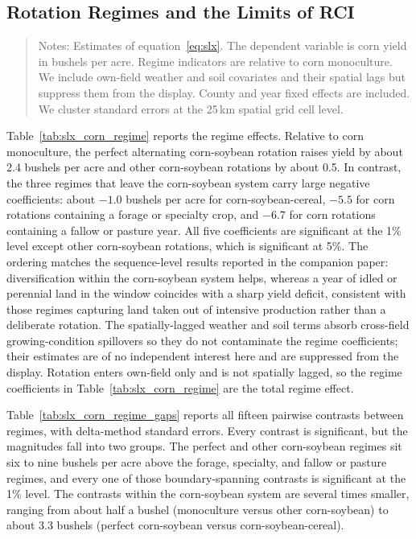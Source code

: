 \documentclass[12pt,letterpaper]{article}
\theoremstyle{remark}
\theoremstyle{remark}
\let\oldtable\table
\let\endoldtable\endtable
\renewenvironment{table}[1][H]{\oldtable[H]}{\endoldtable}
\theoremstyle{plain}
\theoremstyle{definition}
\begin{document}
\subsection{\label{subsec:regimes}Rotation Regimes and the Limits of RCI}

\begin{table}[H]
  \centering
  \caption{Corn yield by rotation regime (SLX specification).}
  \label{tab:slx_corn_regime}
  
\end{table}
\begin{quote}
\small
Notes: Estimates of equation~\eqref{eq:slx}. The dependent variable is corn yield in bushels per acre. Regime indicators are relative to corn monoculture. We include own-field weather and soil covariates and their spatial lags but suppress them from the display. County and year fixed effects are included. We cluster standard errors at the 25\,km spatial grid cell level.
\end{quote}

Table~\ref{tab:slx_corn_regime} reports the regime effects. Relative to corn monoculture, the perfect alternating corn-soybean rotation raises yield by about 2.4 bushels per acre and other corn-soybean rotations by about 0.5. In contrast, the three regimes that leave the corn-soybean system carry large negative coefficients: about $-1.0$ bushels per acre for corn-soybean-cereal, $-5.5$ for corn rotations containing a forage or specialty crop, and $-6.7$ for corn rotations containing a fallow or pasture year. All five coefficients are significant at the 1\% level except other corn-soybean rotations, which is significant at 5\%. The ordering matches the sequence-level results reported in the companion paper: diversification within the corn-soybean system helps, whereas a year of idled or perennial land in the window coincides with a sharp yield deficit, consistent with those regimes capturing land taken out of intensive production rather than a deliberate rotation. The spatially-lagged weather and soil terms absorb cross-field growing-condition spillovers so they do not contaminate the regime coefficients; their estimates are of no independent interest here and are suppressed from the display. Rotation enters own-field only and is not spatially lagged, so the regime coefficients in Table~\ref{tab:slx_corn_regime} are the total regime effect.

Table~\ref{tab:slx_corn_regime_gaps} reports all fifteen pairwise contrasts between regimes, with delta-method standard errors. Every contrast is significant, but the magnitudes fall into two groups. The perfect and other corn-soybean regimes sit six to nine bushels per acre above the forage, specialty, and fallow or pasture regimes, and every one of those boundary-spanning contrasts is significant at the 1\% level. The contrasts within the corn-soybean system are several times smaller, ranging from about half a bushel (monoculture versus other corn-soybean) to about 3.3 bushels (perfect corn-soybean versus corn-soybean-cereal).
\end{document}
